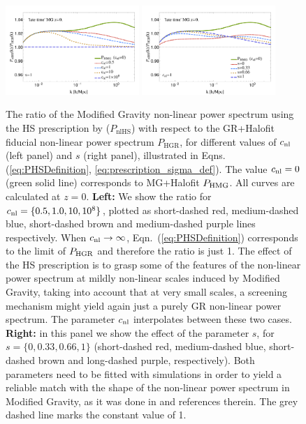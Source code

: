 \begin{figure}[htbp]
\begin{centering}
\includegraphics[width=0.45\textwidth]{Chapters/linear-nonlinear-MG-forecasts/figures/power-spectra/pk-Ratios-ZhaovsGRNL-MGDE2nonuhs-z_0p-zind_1}
\includegraphics[width=0.45\textwidth]{Chapters/linear-nonlinear-MG-forecasts/figures/power-spectra/pk-Ratios-Zhao_SigmaExp-vsGRNL-MGDE2nonuhs-z_0p-zind_1} 
\end{centering}
\caption[Effect of the non-linear Hu\&\ Sawicki prescription]{\label{fig:lin-nonlin-Zhao-MG} The ratio of the Modified Gravity non-linear
power spectrum using the HS prescription by \cite{hu_parameterized_2007}
($P_{\mathrm{nlHS}}$) with respect to the GR+Halofit fiducial non-linear power spectrum $P_{\mathrm{HGR}}$, 
for different values of $c_{\mathrm{nl}}$ (left panel) and $s$ (right panel),
illustrated in Eqns.(\ref{eq:PHSDefinition}, \ref{eq:prescription_sigma_def}).
The value $c_{\mathrm{nl}}=0$ (green solid line) corresponds
to MG+Halofit $P_{\mathrm{HMG}}$.
All curves are calculated at $z=0$.
\textbf{Left: } We show the ratio for $c_{\mathrm{nl}}=\{0.5,1.0,10,10^8\}$,
plotted as short-dashed red, medium-dashed blue, short-dashed brown and medium-dashed purple
lines respectively. When $c_{\mathrm{nl}}\rightarrow\infty$, Eqn.\ (\ref{eq:PHSDefinition})
corresponds to the limit of $P_{\mathrm{HGR}}$ and therefore the ratio is
just 1. The effect of the HS prescription
is to grasp some of the features of the non-linear power spectrum
at mildly non-linear scales induced by Modified Gravity, taking into
account that at very small scales, a screening mechanism might yield
again just a purely GR non-linear power spectrum. The parameter $c_{\mathrm{nl}}$
interpolates between these two cases. \textbf{Right: }in this panel
we show the effect of the parameter $s$, for $s=\{0,0.33,0.66,1\}$
(short-dashed red, medium-dashed blue, short-dashed brown and long-dashed
purple, respectively). Both parameters need to be fitted with simulations
in order to yield a reliable match with the shape of the non-linear
power spectrum in Modified Gravity, as it was done in \cite{zhao_n-body_2011}
and references therein. The grey dashed line marks the constant value of 1.}
\end{figure}




